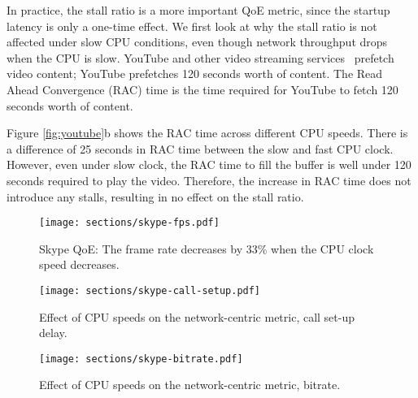 In practice, the stall ratio is a more important QoE metric, since the startup latency is only a one-time effect. We first look at why the stall ratio is not affected under slow CPU conditions, even though network throughput drops when the CPU is slow. YouTube and other video streaming services~\cite{netflix,hbogo} prefetch video content; YouTube prefetches 120 seconds worth of content. The Read Ahead Convergence (RAC) time is the time required for YouTube to fetch  120 seconds worth of content. 

Figure \ref{fig:youtube}b shows the RAC time across different CPU speeds.  There is a difference of 25 seconds in RAC time between the slow and fast CPU clock. However, even under slow clock, the RAC time to fill the buffer is well under 120 seconds required to play the video. Therefore, the increase in RAC time does not introduce any stalls, resulting in no effect on the stall ratio.  %





\begin{figure*}
\begin{minipage}[t]{.33\textwidth}
   \texttt{[image: sections/skype-fps.pdf]}
   \caption{Skype QoE: The frame rate decreases by 33\% when the CPU clock speed decreases.} 
   \vspace{-0.2in}
   \label{fig:skype-framerate}
\end{minipage}
\hspace{0.1in}
\begin{minipage}[t]{.33\textwidth}
   \texttt{[image: sections/skype-call-setup.pdf]}
   \caption{Effect of CPU speeds on the network-centric metric, call set-up delay.} 
   \vspace{-0.2in}
   \label{fig:skype-call}
\end{minipage}
\hspace{0.1in}
\begin{minipage}[t]{.33\textwidth}
   \texttt{[image: sections/skype-bitrate.pdf]}
   \caption{Effect of CPU speeds on the network-centric metric, bitrate.} 
   \vspace{-0.2in}
   \label{fig:skype-bitrate}
   \end{minipage}
\end{figure*}

